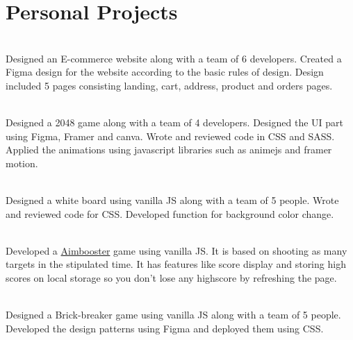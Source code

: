 \documentclass[]{deedy-resume-openfont}
\begin{document}
\begin{minipage}[t]{0.66\textwidth}

\section{Personal Projects}

 \\
Designed an E-commerce website along with a team of 6 developers. Created a Figma design for the website according to the basic rules of design. Design included 5 pages consisting landing, cart, address, product and orders pages.
\sectionsep

 \\
Designed a 2048 game along with a team of 4 developers. Designed the UI part using Figma, Framer and canva. Wrote and reviewed code in CSS and SASS. Applied the animations using javascript libraries such as animejs and framer motion.
\sectionsep

  \\
Designed a white board using vanilla JS along with a team of 5 people. Wrote and reviewed code for CSS. Developed function for background color change. 
\sectionsep

 \\
Developed a \href{http://www.aimbooster.com/}{Aimbooster} game using vanilla JS. It is based on shooting as many targets in the stipulated time. It has features like score display and storing high scores on local storage so you don't lose any highscore by refreshing the page.   
\sectionsep

 \\
Designed a Brick-breaker game using vanilla JS along with a team of 5 people. Developed the design patterns using Figma and deployed them using CSS. 
\sectionsep


\end{minipage} 
\end{document}
